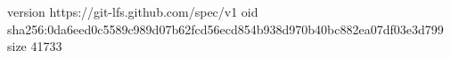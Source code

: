 version https://git-lfs.github.com/spec/v1
oid sha256:0da6eed0c5589c989d07b62fcd56ecd854b938d970b40bc882ea07df03e3d799
size 41733
